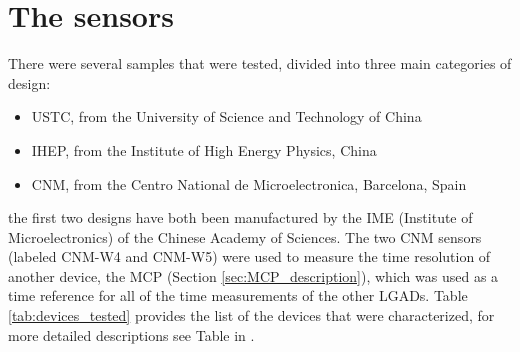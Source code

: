\section{The sensors}

There were several samples that were tested, divided into three main categories of design:
\begin{itemize}
    \item USTC, from the University of Science and Technology of China
    \item IHEP, from the Institute of High Energy Physics, China
    \item CNM, from the Centro National de Microelectronica, Barcelona, Spain
\end{itemize}

the first two designs have both been manufactured by the IME (Institute of Microelectronics) of the Chinese Academy of Sciences. The two CNM sensors (labeled CNM-W4 and CNM-W5) were used to measure the time resolution of another device, the MCP (Section \ref{sec:MCP_description}), which was used as a time reference for all of the time measurements of the other LGADs. Table \ref{tab:devices_tested} provides the list of the devices that were characterized, for more detailed descriptions see Table in .



